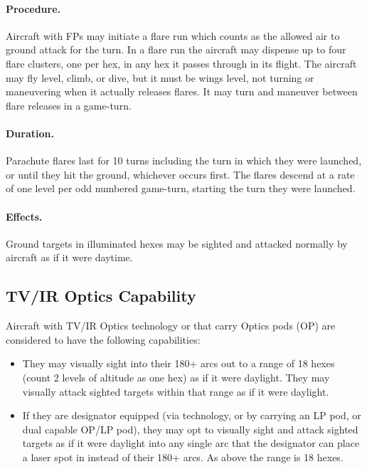 \begin{advancedrules}
{\paragraph{Procedure.} Aircraft with FPs may initiate a flare run which counts as the allowed air to ground attack for the turn. In a flare run the aircraft may dispense up to four flare clusters, one per hex, in any hex it passes through in its flight. The aircraft may fly level, climb, or dive, but it must be wings level, not turning or maneuvering when it actually releases flares. It may turn and maneuver between flare releases in a game-turn.

\paragraph{Duration.} Parachute flares last for 10 turns including the turn in which they were launched, or until they hit the ground, whichever occurs first. The flares descend at a rate of one level per odd numbered game-turn, starting the turn they were launched.

\paragraph{Effects.} Ground targets in illuminated hexes may be sighted and attacked normally by aircraft as if it were daytime.

\subsection{TV/IR Optics Capability}

Aircraft with TV/IR Optics technology or that carry Optics pods (OP) are considered to have the following capabilities:

\begin{itemize}

    \item They may visually sight into their 180+ arcs out to a range of 18 hexes (count 2 levels of altitude as one hex) as if it were daylight. They may visually attack sighted targets within that range as if it were daylight. 

    \item If they are designator equipped (via technology, or by carrying an LP pod, or dual capable OP/LP pod), they may opt to visually sight and attack sighted targets as if it were daylight into any single arc that the designator can place a laser spot in instead of their 180+ arcs. As above the range is 18 hexes.


\end{itemize}}
\end{advancedrules}
